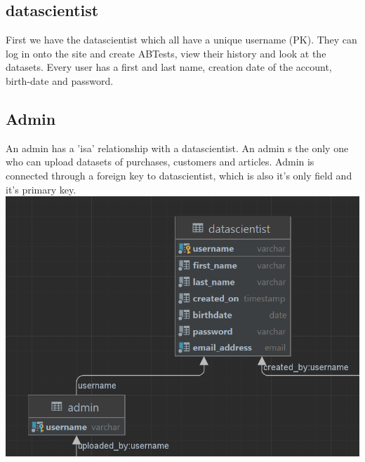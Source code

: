 \documentclass[a4paper,12pt]{article}
\begin{document}
	\subsection{datascientist}
	First we have the datascientist which all have a unique username (PK). They can log in onto the site and create ABTests, view their history and look at the datasets. Every user has a first and last name, creation date of the account, birth-date and password.
	\begin{center}
	\subsection{Admin}
	An admin has a 'isa' relationship with a datascientist. An admin s the only one who can upload datasets of purchases, customers and articles. Admin is connected through a foreign key to datascientist, which is also it's only field and it's primary key.
		  		\includegraphics[width=\textwidth]{Users.png}
	\end{center}
	\pagebreak
\end{document}
